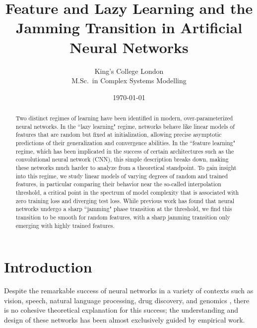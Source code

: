 \documentclass[11pt]{article}
\begin{document}
\title{\bf Feature and Lazy Learning and the Jamming Transition in Artificial Neural Networks}
\author{
    King's College London\\
    M.Sc.\ in Complex Systems Modelling
}
\date{\today}

\begin{titlingpage}
\maketitle
\begin{abstract}
Two distinct regimes of learning have been identified in modern, over-parameterized neural networks. In the ``lazy learning" regime, networks behave like linear models of features that are random but fixed at initialization, allowing precise asymptotic predictions of their generalization and convergence abilities. In the ``feature learning" regime, which has been implicated in the success of certain architectures such as the convolutional neural network (CNN), this simple description breaks down, making these networks much harder to analyze from a theoretical standpoint. To gain insight into this regime, we study linear models of varying degrees of random and trained features, in particular comparing their behavior near the so-called interpolation threshold, a critical point in the spectrum of model complexity that is associated with zero training loss and diverging test loss. While previous work has found that neural networks undergo a sharp ``jamming" phase transition at the threshold, we find this transition to be smooth for random features, with a sharp jamming transition only emerging with highly trained features.
\end{abstract}
\end{titlingpage}

\tableofcontents
\newpage

\section{Introduction}
Despite the remarkable success of neural networks in a variety of contexts such as vision, speech, natural language processing, drug discovery, and genomics \cite{lecunDeepLearning2015}, there is no cohesive theoretical explanation for this success; the understanding and design of these networks has been almost exclusively guided by empirical work. \\
\end{document}
